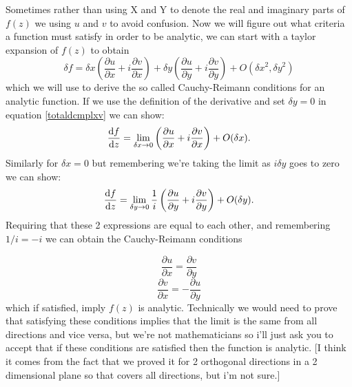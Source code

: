  Sometimes rather than using X and Y to denote the real and imaginary parts of $f(z)$ we using $u$ and $v$ to avoid confusion.
  Now we will figure out what criteria a function must satisfy in order to be analytic, we can start with a taylor expansion of $f(z)$ to obtain
 \begin{equation}
 \label{totaldcmplxv}
 \delta f=\delta x \left(\frac{\partial u}{\partial x} + i \frac{\partial v}{\partial x}\right) + \delta y \left(\frac{\partial u}{\partial y}+i\frac{\partial v}{\partial y}\right) + O\left({\delta x}^2,{\delta y}^2\right)
 \end{equation}
 which we will use to derive the so called Cauchy-Reimann conditions for an analytic function. If we use the definition of the derivative and set $\delta y=0$ in equation \ref{totaldcmplxv} we can show:
 \begin{equation*}
 \frac{\mathop{}\!\mathrm{d} f}{\mathop{}\!\mathrm{d} z}=\lim_{\delta x\to 0}\left(\frac{\partial u}{\partial x} + i \frac{\partial v}{\partial x}\right) + O(\delta x).
 \end{equation*}
Similarly for $\delta x=0$ but remembering we're taking the limit as $i\delta y$ goes to zero we can show:
\begin{equation*}
\frac{\mathop{}\!\mathrm{d} f}{\mathop{}\!\mathrm{d} z}=\lim_{\delta y\to 0}\frac{1}{i}\left(\frac{\partial u}{\partial y} + i \frac{\partial v}{\partial y}\right) + O(\delta y).
\end{equation*}
Requiring that these 2 expressions are equal to each other, and remembering $1/i=-i$ we can obtain the Cauchy-Reimann conditions

\begin{equation}
\frac{\partial u}{\partial x}=\frac{\partial v}{\partial y}
\end{equation}
\begin{equation*}
\frac{\partial v}{\partial x}=-\frac{\partial u}{\partial y} 
\end{equation*}
which if satisfied, imply $f(z)$ is analytic. Technically we would need to prove that satisfying these conditions implies that the limit is the same from all directions and vice versa, but we're not mathematicians so i'll just ask you to accept that if these conditions are satisfied then the function is analytic. [I think it comes from the fact that we proved it for 2 orthogonal directions in a 2 dimensional plane so that covers all directions, but i'm not sure.]



 